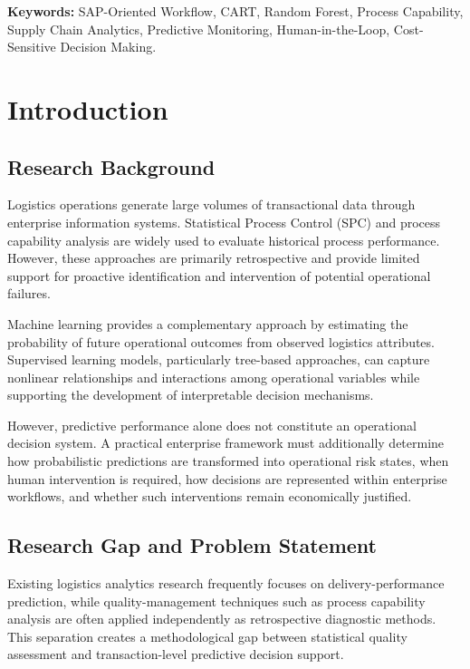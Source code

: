 \documentclass[11pt,a4paper]{article}
\begin{document}
\textbf{Keywords:}
SAP-Oriented Workflow, CART, Random Forest, Process Capability, Supply Chain Analytics, Predictive Monitoring, Human-in-the-Loop, Cost-Sensitive Decision Making.

\section{Introduction}

\subsection{Research Background}

Logistics operations generate large volumes of transactional data through enterprise information systems. Statistical Process Control (SPC) and process capability analysis are widely used to evaluate historical process performance. However, these approaches are primarily retrospective and provide limited support for proactive identification and intervention of potential operational failures.

Machine learning provides a complementary approach by estimating the probability of future operational outcomes from observed logistics attributes. Supervised learning models, particularly tree-based approaches, can capture nonlinear relationships and interactions among operational variables while supporting the development of interpretable decision mechanisms.

However, predictive performance alone does not constitute an operational decision system. A practical enterprise framework must additionally determine how probabilistic predictions are transformed into operational risk states, when human intervention is required, how decisions are represented within enterprise workflows, and whether such interventions remain economically justified.

\subsection{Research Gap and Problem Statement}

Existing logistics analytics research frequently focuses on delivery-performance prediction, while quality-management techniques such as process capability analysis are often applied independently as retrospective diagnostic methods. This separation creates a methodological gap between statistical quality assessment and transaction-level predictive decision support.
\end{document}
